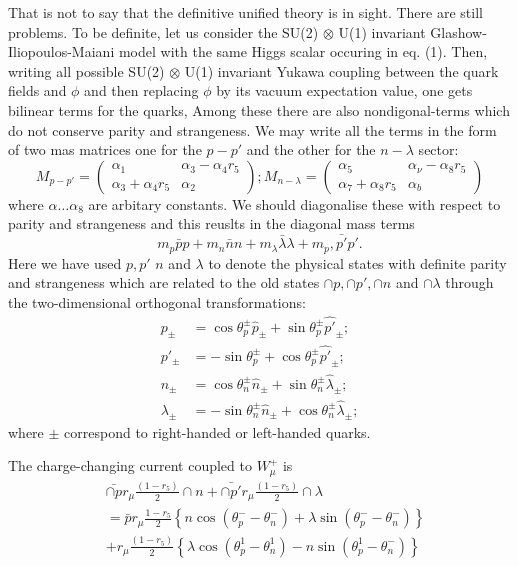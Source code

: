 That is not to say that the definitive unified theory is in sight. There are still problems. To be definite, let us consider the SU(2) $\otimes$ U(1) invariant Glashow-Iliopoulos-Maiani model with the same Higgs scalar occuring in eq. (1). Then, writing all possible SU(2) $\otimes$ U(1) invariant Yukawa coupling between the quark fields and $\phi$ and then replacing $\phi$ by its vacuum expectation value, one gets bilinear terms for the quarks, Among these there are also nondigonal-terms which do not conserve parity and strangeness. We may write all the terms in the form of two mas matrices one for the $p-p'$ and the other for the $n-\lambda$ sector:
\begin{equation*}
M_{p-p'} =
\begin{pmatrix}
\alpha_{1} & \alpha_{3}-\alpha_{4} r_{5}\\
\alpha_{3} + \alpha_{4} r_{5} & \alpha_{2}
\end{pmatrix};
M_{n-\lambda} =
\begin{pmatrix}
\alpha_{5} & \alpha_{\nu}-\alpha_{8} r_{5}\\
\alpha_{7} + \alpha_{8} r_{5} & \alpha_{b}
\end{pmatrix}\tag{7}
\end{equation*}
where $\alpha \ldots \alpha_{8}$ are arbitary constants. We should diagonalise these with respect to parity and strangeness and this reuslts in the diagonal mass terms
$$
m_{p} \bar{p} p + m_{n} \bar{n} n + m_{\lambda} \bar{\lambda} \lambda + m_{p}, \bar{p'}p'.
$$
Here we have used $p, p'$ $n$ and $\lambda$ to denote the physical states with definite parity and strangeness which are related to the old states $\cap{p}, \cap{p'}, \cap{n}$ and $\cap{\lambda}$ through the two-dimensional orthogonal transformations:
\begin{align*}
p_{\pm} &= \cos \theta^{\pm}_{p} \hat{p}_{\pm} + \sin \theta^{\pm}_{p} \hat{p'}_{\pm};\\
p'_{\pm} &= -\sin \theta_{p}^{\pm} + \cos \theta^{\pm}_{p} \hat{p'}_{\pm};\\
n_{\pm} &= \cos \theta^{\pm}_{n} \hat{n}_{\pm} + \sin \theta^{\pm}_{n} \hat{\lambda}_{\pm};\\
\lambda_{\pm} &= -\sin \theta^{\pm}_{n} \hat{n}_{\pm} + \cos \theta^{\pm}_{n} \hat{\lambda}_{\pm};\tag{6}
\end{align*}
where $\pm$ correspond to right-handed or left-handed quarks.

The charge-changing current coupled to $W^{+}_{\mu}$ is 
\begin{align*}
&\bar{\cap{p}} r_{\mu} \frac{(1-r_{5})}{2}\cap{n} + \bar{\cap{p'}} r_{\mu} \frac{(1-r_{5})}{2}\cap{\lambda}\\
&= \bar{p}r_{\mu} \frac{1-r_{5}}{2} \left\{n \cos(\theta^{-}_{p}-\theta^{-}_{n}) + \lambda \sin (\theta^{-}_{p}-\theta^{-}_{n}) \right\}\\
& + r_{\mu} \frac{(1-r_{5})}{2} \left\{\lambda \cos (\theta^{1}_{p}-\theta^{1}_{n}) - n \sin(\theta^{1}_{p}-\theta^{-}_{n}) \right\}\tag{9}
\end{align*}

